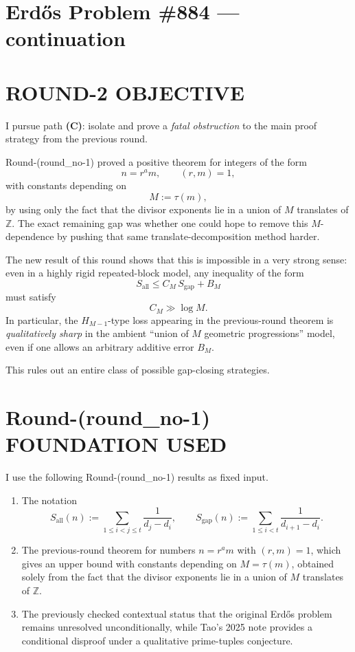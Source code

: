 \section{Erd\H{o}s Problem \#884 --- continuation}

\section{ROUND-2 OBJECTIVE}

I pursue path \textbf{(C)}: isolate and prove a \emph{fatal obstruction} to the main proof strategy from the previous round.

Round-(round\_no-1) proved a positive theorem for integers of the form
\[
n=r^a m,\qquad (r,m)=1,
\]
with constants depending on
\[
M:=\tau(m),
\]
by using only the fact that the divisor exponents lie in a union of \(M\) translates of \(\mathbb Z\). The exact remaining gap was whether one could hope to remove this \(M\)-dependence by pushing that same translate-decomposition method harder.

The new result of this round shows that this is impossible in a very strong sense: even in a highly rigid repeated-block model, any inequality of the form
\[
S_{\mathrm{all}}\le C_M\,S_{\mathrm{gap}}+B_M
\]
must satisfy
\[
C_M\gg \log M.
\]
In particular, the \(H_{M-1}\)-type loss appearing in the previous-round theorem is \emph{qualitatively sharp} in the ambient ``union of \(M\) geometric progressions'' model, even if one allows an arbitrary additive error \(B_M\).

This rules out an entire class of possible gap-closing strategies.

\section{Round-(round\_no-1) FOUNDATION USED}

I use the following Round-(round\_no-1) results as fixed input.

\begin{enumerate}
\item The notation
\[
S_{\mathrm{all}}(n):=\sum_{1\le i<j\le t}\frac{1}{d_j-d_i},
\qquad
S_{\mathrm{gap}}(n):=\sum_{1\le i<t}\frac{1}{d_{i+1}-d_i}.
\]
\item The previous-round theorem for numbers \(n=r^a m\) with \((r,m)=1\), which gives an upper bound with constants depending on \(M=\tau(m)\), obtained solely from the fact that the divisor exponents lie in a union of \(M\) translates of \(\mathbb Z\).
\item The previously checked contextual status that the original Erd\H{o}s problem remains unresolved unconditionally, while Tao's 2025 note provides a conditional disproof under a qualitative prime-tuples conjecture.
\end{enumerate}

